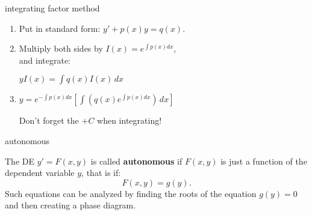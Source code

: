 \documentclass[avery5371,grid]{flashcards}
\newcommand{\defn}[1]{\textbf{#1}}
\begin{document}
\begin{flashcard}[Algorithm]{integrating factor method}

  \begin{enumerate}
  \item Put in standard form:
    \(
      y' + p(x)y = q(x).
    \)
  \item Multiply both sides by $I(x) = e^{\int\! p(x)dx}$, \\
    and integrate:

    \(
    y I(x) = \displaystyle \int q(x)I(x) \, dx
    \)
  \item
    \(
    y = \displaystyle e^{-\int\! p(x) dx}
    \left[ \int \left( q(x)e^{\int \!p(x) dx} \right)\, dx \right]
    \)

    Don't forget the $+C$ when integrating!

  \end{enumerate}




\end{flashcard}

\begin{flashcard}[Definition]{autonomous}

  The DE $y' = F(x,y)$ is called \defn{autonomous} if $F(x,y)$ is just
  a function of the dependent variable $y$, that is if:
  \[
    F(x,y) = g(y).
  \]
  Such equations can be analyzed by finding the roots of the equation
  $g(y)=0$ and then creating a phase diagram.

\end{flashcard}



\end{document}
